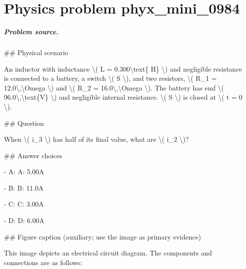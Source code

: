 
\chapter{Physics problem phyx\_mini\_0984}
\label{ch:PhyXMiniProblems_problem_phyx_mini_0984}

\paragraph{Problem source.}
\#\# Physical scenario

An inductor with inductance \textbackslash{}( L = 0.300\textbackslash{}text\{ H\} \textbackslash{}) and negligible resistance is connected to a battery, a switch \textbackslash{}( S \textbackslash{}), and two resistors, \textbackslash{}( R\_1 = 12.0\textbackslash{},\textbackslash{}Omega \textbackslash{}) and \textbackslash{}( R\_2 = 16.0\textbackslash{},\textbackslash{}Omega \textbackslash{}). The battery has emf \textbackslash{}( 96.0\textbackslash{},\textbackslash{}text\{V\} \textbackslash{}) and negligible internal resistance. \textbackslash{}( S \textbackslash{}) is closed at \textbackslash{}( t = 0 \textbackslash{}).

\#\# Question

When \textbackslash{}( i\_3 \textbackslash{}) has half of its final value, what are \textbackslash{}( i\_2 \textbackslash{})?

\#\# Answer choices

- A: A: 5.00A

- B: B: 11.0A

- C: C: 3.00A

- D: D: 6.00A

\#\# Figure caption (auxiliary; use the image as primary evidence)

This image depicts an electrical circuit diagram. The components and connections are as follows:

